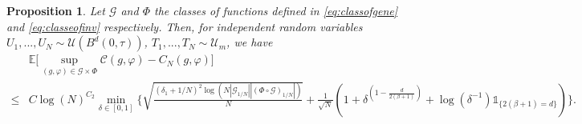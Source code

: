 \documentclass[10pt]{article}
\newtheorem{proposition}{Proposition}
\begin{document}
\begin{proposition}\label{prop:statisticalerrorC} Let $\mathcal{G}$ and $\Phi$ the classes of functions defined in \eqref{eq:classofgene} and \eqref{eq:classeofinv} respectively. Then, for independent random variables  $U_1,...,U_N\sim \mathcal{U}(B^d(0,\tau))$, $T_1,...,T_N\sim \mathcal{U}_m$, we have
\begin{align*}
& \mathbb{E}\Big[\sup_{(g,\varphi)\in \mathcal{G}\times  \Phi} \mathcal{C}(g,\varphi)-C_N(g,\varphi)\Big]\\
 \leq &  C\log(N)^{C_2}\min \limits_{\delta \in [0,1]}  \Biggl\{ \sqrt{\frac{(\delta_1+1/N)^2\log(N|\mathcal{G}_{1/N}||(\Phi \circ \mathcal{G})_{1/N}|)}{N}}+\frac{1}{\sqrt{N}}(1+\delta^{(1-\frac{d}{2(\beta+1)})}+\log(\delta^{-1})\mathds{1}_{\{2(\beta+1)= d\}})\Biggl\}.
\end{align*}
\end{proposition}
\end{document}
